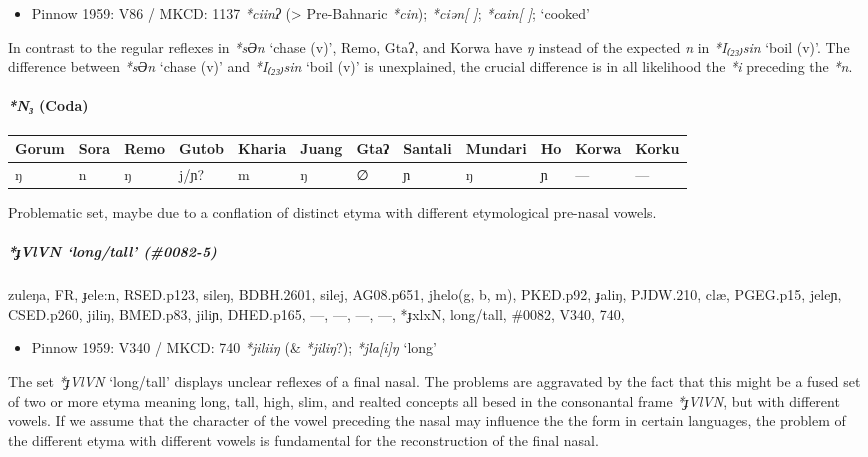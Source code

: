 \documentclass[a4paper,]{article}
\providecommand{\tightlist}{%
  \setlength{\itemsep}{0pt}\setlength{\parskip}{0pt}}
\let\oldparagraph\paragraph
\renewcommand{\paragraph}[1]{\oldparagraph{#1}\mbox{}}
\let\oldsubparagraph\subparagraph
\renewcommand{\subparagraph}[1]{\oldsubparagraph{#1}\mbox{}}
\begin{document}
\begin{itemize}
\tightlist
\item
  Pinnow 1959: V86 / MKCD: 1137 \emph{*ciinʔ} (\textgreater{}
  Pre-Bahnaric \emph{*cin}); \emph{*ciən{[} {]}}; \emph{*cain{[} {]}};
  `cooked'
\end{itemize}

In contrast to the regular reflexes in \emph{*sƏn} `chase (v)', Remo,
Gtaʔ, and Korwa have \emph{ŋ} instead of the expected \emph{n} in
\emph{*I₍₂₃₎sin} `boil (v)'. The difference between \emph{*sƏn} `chase
(v)' and \emph{*I₍₂₃₎sin} `boil (v)' is unexplained, the crucial
difference is in all likelihood the \emph{*i} preceding the \emph{*n}.

\paragraph{\texorpdfstring{\emph{*N₃}
(Coda)}{*N₃ (Coda)}}\label{n-coda-2}

\begin{longtable}[]{@{}llllllllllll@{}}
\toprule
Gorum & Sora & Remo & Gutob & Kharia & Juang & Gtaʔ & Santali & Mundari
& Ho & Korwa & Korku\tabularnewline
\midrule
\endhead
ŋ & n & ŋ & j/ɲ? & m & ŋ & ∅ & ɲ & ŋ & ɲ & --- & ---\tabularnewline
\bottomrule
\end{longtable}

Problematic set, maybe due to a conflation of distinct etyma with
different etymological pre-nasal vowels.

\subparagraph{\texorpdfstring{\emph{*ɟVlVN} `long/tall'
(\#0082-5)}{*ɟVlVN long/tall (\#0082-5)}}\label{ux25fvlvn-longtall-0082-5}

zuleŋa, FR, ɟele:n, RSED.p123, sileŋ, BDBH.2601, silej, AG08.p651,
jhelo(g, b, m), PKED.p92, ɟaliŋ, PJDW.210, clæ, PGEG.p15, jeleɲ,
CSED.p260, jiliŋ, BMED.p83, jiliɲ, DHED.p165, ---, ---, ---, ---,
*ɟxlxN, long/tall, \#0082, V340, 740,

\begin{itemize}
\tightlist
\item
  Pinnow 1959: V340 / MKCD: 740 \emph{*jiliiŋ} (\& \emph{*jiliŋ}?);
  \emph{*jla{[}i{]}ŋ} `long'
\end{itemize}

The set \emph{*ɟVlVN} `long/tall' displays unclear reflexes of a final
nasal. The problems are aggravated by the fact that this might be a
fused set of two or more etyma meaning long, tall, high, slim, and
realted concepts all besed in the consonantal frame \emph{*ɟVlVN}, but
with different vowels. If we assume that the character of the vowel
preceding the nasal may influence the the form in certain languages, the
problem of the different etyma with different vowels is fundamental for
the reconstruction of the final nasal.
\end{document}

